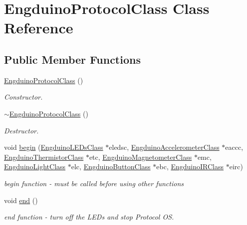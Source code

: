 \hypertarget{class_engduino_protocol_class}{}\section{Engduino\+Protocol\+Class Class Reference}
\label{class_engduino_protocol_class}
\subsection*{Public Member Functions}
\begin{DoxyCompactItemize}
\item 
\hyperlink{group___engduino_protocol_gaa4f020ed2ebb02ce57afce1c6395627c}{Engduino\+Protocol\+Class} ()
\begin{DoxyCompactList}\small\item\em Constructor. \end{DoxyCompactList}\item 
\hyperlink{group___engduino_protocol_gad15fd39a7f4787cf6c8bbfc101df4387}{$\sim$\+Engduino\+Protocol\+Class} ()
\begin{DoxyCompactList}\small\item\em Destructor. \end{DoxyCompactList}\item 
void \hyperlink{group___engduino_protocol_ga34fa624085b8267e2793094c67e083e2}{begin} (\hyperlink{class_engduino_l_e_ds_class}{Engduino\+L\+E\+Ds\+Class} $\ast$eledsc, \hyperlink{class_engduino_accelerometer_class}{Engduino\+Accelerometer\+Class} $\ast$eaccc, \hyperlink{class_engduino_thermistor_class}{Engduino\+Thermistor\+Class} $\ast$etc, \hyperlink{class_engduino_magnetometer_class}{Engduino\+Magnetometer\+Class} $\ast$emc, \hyperlink{class_engduino_light_class}{Engduino\+Light\+Class} $\ast$elc, \hyperlink{class_engduino_button_class}{Engduino\+Button\+Class} $\ast$ebc, \hyperlink{class_engduino_i_r_class}{Engduino\+I\+R\+Class} $\ast$eirc)
\begin{DoxyCompactList}\small\item\em begin function -\/ must be called before using other functions \end{DoxyCompactList}\item 
void \hyperlink{group___engduino_protocol_ga9fe175a6fd0fce69ad087785485f4a61}{end} ()
\begin{DoxyCompactList}\small\item\em end function -\/ turn off the L\+E\+Ds and stop Protocol O\+S. \end{DoxyCompactList}\item 

\end{DoxyCompactItemize}
